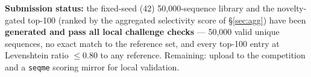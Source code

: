 \documentclass[11pt]{article}
\begin{document}
\textbf{Submission status:} the fixed-seed (42) 50{,}000-sequence library and the novelty-gated
top-100 (ranked by the aggregated selectivity score of \S\ref{sec:agg}) have been \textbf{generated
and pass all local challenge checks} --- 50{,}000 valid unique sequences, no exact match to the
reference set, and every top-100 entry at Levenshtein ratio $\le 0.80$ to any reference. Remaining:
upload to the competition and a \texttt{seqme} scoring mirror for local validation.
\end{document}
